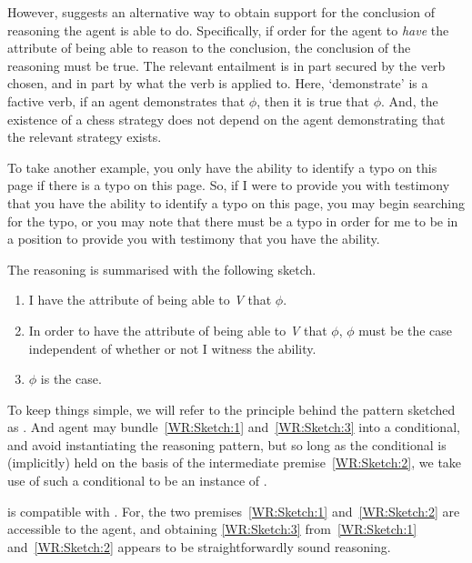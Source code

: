 \begin{note}[Compatibility]
  However, \AR{} suggests an alternative way to obtain support for the conclusion of reasoning the agent is able to do.
  Specifically, if order for the agent to \emph{have} the attribute of being able to reason to the conclusion, the conclusion of the reasoning must be true.
  The relevant entailment is in part secured by the verb chosen, and in part by what the verb is applied to.
  Here, `demonstrate' is a factive verb, if an agent demonstrates that \(\phi\), then it is true that \(\phi\).
  And, the existence of a chess strategy does not depend on the agent demonstrating that the relevant strategy exists.

  To take another example, you only have the ability to identify a typo on this page if there is a typo on this page.
  So, if I were to provide you with testimony that you have the ability to identify a typo on this page, you may begin searching for the typo, or you may note that there must be a typo in order for me to be in a position to provide you with testimony that you have the ability.

  The reasoning is summarised with the following sketch.

  \begin{enumerate}[label=(\textsf{A}\arabic*), ref=(\textsf{A}\arabic*)]
  \item\label{WR:Sketch:1} I have the attribute of being able to \emph{V} that \(\phi\).
  \item\label{WR:Sketch:2} In order to have the attribute of being able to \emph{V} that \(\phi\), \(\phi\) must be the case independent of whether or not I witness the ability.
  \item\label{WR:Sketch:3} \(\phi\) is the case.
  \end{enumerate}

  To keep things simple, we will refer to the principle behind the pattern sketched as \AR{}.
  And agent may bundle~\ref{WR:Sketch:1} and~\ref{WR:Sketch:3} into a conditional, and avoid instantiating the reasoning pattern, but so long as the conditional is (implicitly) held on the basis of the intermediate premise~\ref{WR:Sketch:2}, we take use of such a conditional to be an instance of \AR{}.

  \AR{} is compatible with \uRa{}.
  For, the two premises~\ref{WR:Sketch:1} and~\ref{WR:Sketch:2} are accessible to the agent, and obtaining \ref{WR:Sketch:3} from~\ref{WR:Sketch:1} and~\ref{WR:Sketch:2} appears to be straightforwardly sound reasoning.
\end{note}

